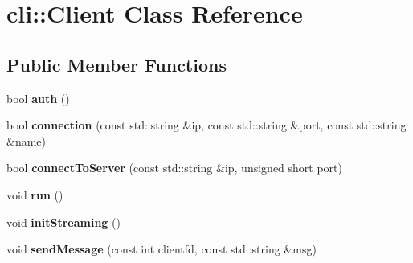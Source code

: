 \hypertarget{classcli_1_1_client}{}\section{cli\+:\+:Client Class Reference}
\label{classcli_1_1_client}
\subsection*{Public Member Functions}
\begin{DoxyCompactItemize}
\item 
\mbox{\label{classcli_1_1_client_a135ecc70f5ac2e08199c0bcd35ed7ea6}} 
bool {\bfseries auth} ()
\item 
\mbox{\label{classcli_1_1_client_af03de9c208ae4568fd41e3fe0dab8fc5}} 
bool {\bfseries connection} (const std\+::string \&ip, const std\+::string \&port, const std\+::string \&name)
\item 
\mbox{\label{classcli_1_1_client_a6ca368944dd2a787e7c244d34c0b99ce}} 
bool {\bfseries connect\+To\+Server} (const std\+::string \&ip, unsigned short port)
\item 
\mbox{\label{classcli_1_1_client_ae0bc335d720265d4d6e8a72cf7a2a9aa}} 
void {\bfseries run} ()
\item 
\mbox{\label{classcli_1_1_client_aea7f1e7aef5acaaecd40476e63063f05}} 
void {\bfseries init\+Streaming} ()
\item 
\mbox{\label{classcli_1_1_client_a14f480bd5001f94e73268462274947b7}} 
void {\bfseries send\+Message} (const int clientfd, const std\+::string \&msg)
\end{DoxyCompactItemize}
